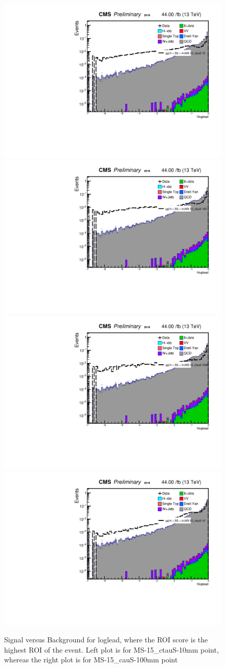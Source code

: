  \begin{figure}[h!]
   \caption{Signal versus Background for loglead, where the ROI score is the highest ROI of the event. Left plot is for MS-15\_ctauS-10mm point, whereas the right plot is for MS-15\_cauS-100mm point}
   \label{fig:leadROIscore}
   \centering
   \includegraphics[width=0.47\linewidth]{figs/log_Oct6ANVars_MS-15_ctauS-10_hloglead.pdf}
   \includegraphics[width=0.47\linewidth]{figs/log_Oct6ANVars_MS-15_ctauS-100_hloglead.pdf}
   \includegraphics[width=0.47\linewidth]{figs/log_Oct6ANVars_MS-15_ctauS-1000_hloglead.pdf}
   \includegraphics[width=0.47\linewidth]{figs/log_Oct6ANVars_MS-55_ctauS-10_hloglead.pdf}
 \end{figure}


